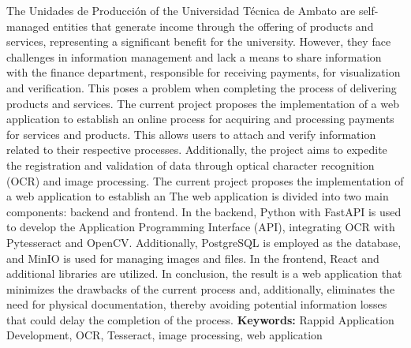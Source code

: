 \newpage
{}
The Unidades de Producción of the Universidad Técnica de Ambato  are self-managed
entities that generate income through the offering of products and services,
representing a significant benefit for the university. However, they face challenges in
information management and lack a means to share information with the finance
department, responsible for receiving payments, for visualization and verification. This
poses a problem when completing the process of delivering products and services.
\bigbreak
The current project proposes the implementation of a web application to establish an
online process for acquiring and processing payments for services and products. This
allows users to attach and verify information related to their respective processes.
Additionally, the project aims to expedite the registration and validation of data
through optical character recognition (OCR) and image processing.
\bigbreak
The current project proposes the implementation of a web application to establish an
The web application is divided into two main components: backend and frontend. In the
backend, Python with FastAPI is used to develop the Application Programming Interface
(API), integrating OCR with Pytesseract and OpenCV. Additionally, PostgreSQL is employed
as the database, and MinIO is used for managing images and files. In the frontend, React
and additional libraries are utilized.
\bigbreak
In conclusion, the result is a web application that minimizes the drawbacks of the
current process and, additionally, eliminates the need for physical documentation,
thereby avoiding potential information losses that could delay the completion of the
process.
\vfill
\textbf{Keywords:} Rappid Application Development, OCR, Tesseract, image processing, web application
